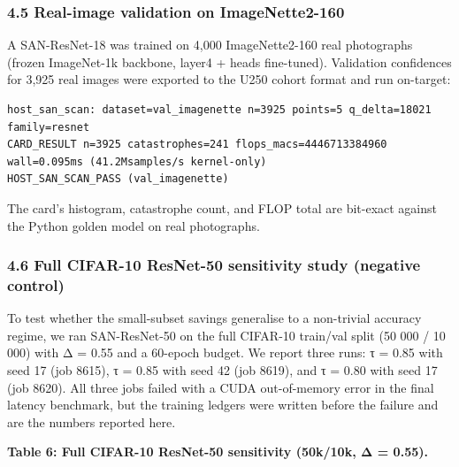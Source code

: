 \documentclass[
]{article}
\begin{document}
\hypertarget{real-image-validation-on-imagenette2-160}{%
\subsubsection{4.5 Real-image validation on
ImageNette2-160}\label{real-image-validation-on-imagenette2-160}}

A SAN-ResNet-18 was trained on 4,000 ImageNette2-160 real photographs
(frozen ImageNet-1k backbone, layer4 + heads fine-tuned). Validation
confidences for 3,925 real images were exported to the U250 cohort
format and run on-target:

\begin{verbatim}
host_san_scan: dataset=val_imagenette n=3925 points=5 q_delta=18021 family=resnet
CARD_RESULT n=3925 catastrophes=241 flops_macs=4446713384960 wall=0.095ms (41.2Msamples/s kernel-only)
HOST_SAN_SCAN_PASS (val_imagenette)
\end{verbatim}

The card's histogram, catastrophe count, and FLOP total are bit-exact
against the Python golden model on real photographs.

\hypertarget{full-cifar-10-resnet-50-sensitivity-study-negative-control}{%
\subsubsection{4.6 Full CIFAR-10 ResNet-50 sensitivity study (negative
control)}\label{full-cifar-10-resnet-50-sensitivity-study-negative-control}}

To test whether the small-subset savings generalise to a non-trivial
accuracy regime, we ran SAN-ResNet-50 on the full CIFAR-10 train/val
split (50 000 / 10 000) with Δ = 0.55 and a 60-epoch budget. We report
three runs: τ = 0.85 with seed 17 (job 8615), τ = 0.85 with seed 42 (job
8619), and τ = 0.80 with seed 17 (job 8620). All three jobs failed with
a CUDA out-of-memory error in the final latency benchmark, but the
training ledgers were written before the failure and are the numbers
reported here.

\textbf{Table 6: Full CIFAR-10 ResNet-50 sensitivity (50k/10k, Δ =
0.55).}
\end{document}
